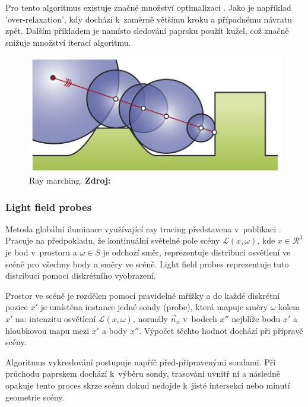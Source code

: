 Pro tento algoritmus existuje značné množství optimalizací \cite{Keinert2014EnhancedST}. Jako je například 'over-relaxation', kdy dochází k~zaměrně většímu kroku a případnému návratu zpět. Dalším příkladem je namísto sledování paprsku použít kužel, což značně snižuje množství iterací algoritmu.

\begin{figure}[H]
	\centering
	\includegraphics[scale=0.8]{obrazky-figures/ray_marching.png}
	\caption{Ray marching. \textbf{Zdroj: \cite{Keinert2014EnhancedST}}}
	\label{fig:ray_marching}
\end{figure}


\subsubsection{Light field probes}
Metoda globální iluminace využívající ray tracing představena v~publikaci \cite{light_field_probes}. Pracuje na předpokladu, že kontinuální světelné pole scény $\mathcal{L}(x, \omega)$, kde $x \in \mathcal{R}^3$ je bod v~prostoru a $\omega \in S$ je odchozí směr, reprezentuje distribuci osvětlení ve scéně pro všechny body a směry ve scéně. Light field probes reprezentuje tuto distribuci pomocí diskrétního vyobrazení.

Prostor ve scéně je rozdělen pomocí pravidelné mřížky a do každé diskrétní pozice $x'$ je umístěna instance jedné sondy (probe), která mapuje směry $\omega$ kolem $x'$ na: intenzitu osvětlení $\mathcal{L}(x, \omega)$, normály $\vec{n}_x$ v~bodech $x''$ nejblíže bodu $x'$ a hloubkovou mapu mezi $x'$ a body $x''$. Výpočet těchto hodnot dochází při přípravě scény.

Algoritmus vykreslování postupuje napříč před-připravenými sondami. Při průchodu paprskem dochází k~výběru sondy, trasování uvnitř ní a následně opakuje tento proces skrze scénu dokud nedojde k~jisté intersekci nebo minutí geometrie scény.

